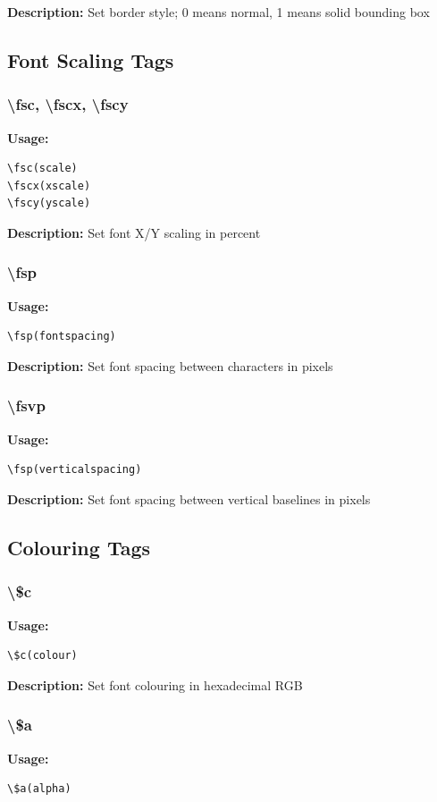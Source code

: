 \documentclass{spec}
\begin{document}
\textbf{Description:}
Set border style; 0 means normal, 1 means solid bounding box

\subsection{Font Scaling Tags}

\subsubsection{\textbackslash fsc, \textbackslash fscx, \textbackslash fscy}
\textbf{Usage:}
\begin{verbatim}
\fsc(scale)
\fscx(xscale)
\fscy(yscale)
\end{verbatim}

\textbf{Description:}
Set font X/Y scaling in percent

\subsubsection{\textbackslash fsp}
\textbf{Usage:}
\begin{verbatim}
\fsp(fontspacing)
\end{verbatim}

\textbf{Description:}
Set font spacing between characters in pixels

\subsubsection{\textbackslash fsvp}
\textbf{Usage:}
\begin{verbatim}
\fsp(verticalspacing)
\end{verbatim}

\textbf{Description:}
Set font spacing between vertical baselines in pixels

\subsection{Colouring Tags}

\subsubsection{\textbackslash \$c}
\textbf{Usage:}
\begin{verbatim}
\$c(colour)
\end{verbatim}

\textbf{Description:}
Set font colouring in hexadecimal RGB

\subsubsection{\textbackslash \$a}
\textbf{Usage:}
\begin{verbatim}
\$a(alpha)
\end{verbatim}
\end{document}
